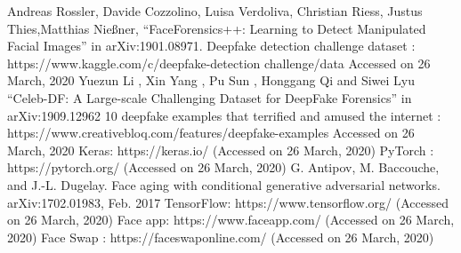 \documentclass[12 pt]{article}
\begin{document}
\begin{thebibliography}{99}
    Andreas Rossler, Davide Cozzolino, Luisa Verdoliva, Christian Riess, Justus
    Thies,Matthias Nießner, “FaceForensics++: Learning to Detect Manipulated Facial
    Images” in arXiv:1901.08971.
    Deepfake detection challenge dataset : https://www.kaggle.com/c/deepfake-detection challenge/data Accessed on 26 March, 2020
     Yuezun Li , Xin Yang , Pu Sun , Honggang Qi and Siwei Lyu “Celeb-DF: A
    Large-scale Challenging Dataset for DeepFake Forensics” in arXiv:1909.12962
    10 deepfake examples that terrified and amused the internet :
    https://www.creativebloq.com/features/deepfake-examples Accessed on 26 March,
    2020
    Keras: https://keras.io/ (Accessed on 26 March, 2020)
    PyTorch : https://pytorch.org/ (Accessed on 26 March, 2020)
    G. Antipov, M. Baccouche, and J.-L. Dugelay. Face aging with conditional generative adversarial networks. arXiv:1702.01983, Feb. 2017
     TensorFlow: https://www.tensorflow.org/ (Accessed on 26 March, 2020)
    Face app: https://www.faceapp.com/ (Accessed on 26 March, 2020)
    Face Swap : https://faceswaponline.com/ (Accessed on 26 March, 2020)

\end{thebibliography}
\end{document}
